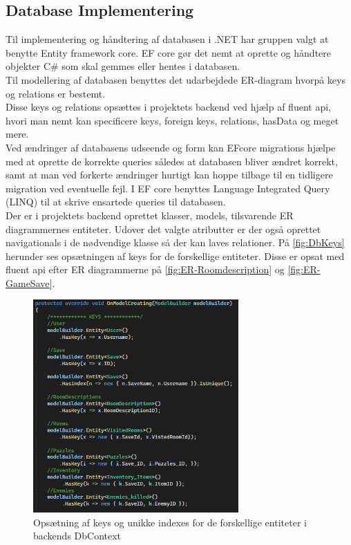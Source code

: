 \subsection{Database Implementering}
\label{Section: DB-Implementering}
Til implementering og håndtering af databasen i .NET har gruppen valgt at benytte Entity framework core.
EF core gør det nemt at oprette og håndtere objekter C\# som skal gemmes eller hentes i databasen.\\
Til modellering af databasen benyttes det udarbejdede ER-diagram hvorpå keys og relations er bestemt.\\
Disse keys og relations opsættes i projektets backend ved hjælp af fluent api, hvori man nemt kan specificere keys, foreign keys, relations, hasData og meget mere.\\
Ved ændringer af databasens udseende og form kan EFcore migrations hjælpe med at oprette de korrekte queries således at databasen bliver ændret korrekt, samt at man ved forkerte ændringer hurtigt kan hoppe tilbage til en tidligere migration ved eventuelle fejl. I EF core benyttes Language Integrated Query (LINQ) til at skrive ensartede queries til databasen.\\

Der er i projektets backend oprettet klasser, models, tilsvarende ER diagrammernes entiteter. Udover det valgte atributter er der også oprettet navigationals i de nødvendige klasse så der kan laves relationer.
På \autoref{fig:DbKeys} herunder ses opsætningen af keys for de forskellige entiteter. Disse er opsat med fluent api efter ER diagrammerne på \autoref{fig:ER-Roomdescription} og \autoref{fig:ER-GameSave}.

\begin{figure}[H]
\centering
\includegraphics[width = 0.7\textwidth]{02-Body/Images/DAL-Database/DbKeys.PNG}
\caption{Opsætning af keys og unikke indexes for de forskellige entiteter i backends DbContext}
\label{fig:DbKeys}
\end{figure}

